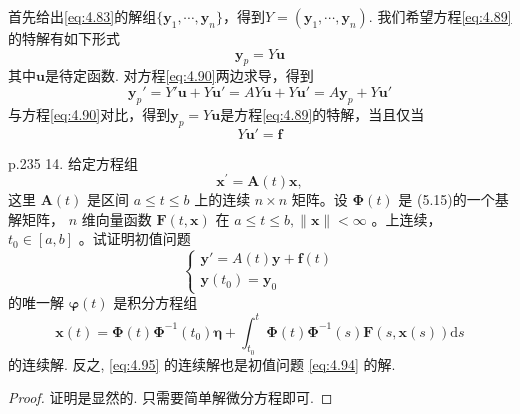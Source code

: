 首先给出\ref{eq:4.83}的解组$\{\mathbf{y}_1,\cdots,\mathbf{y}_n\}$，得到$Y=(\mathbf{y}_1,\cdots,\mathbf{y}_n)$. 我们希望方程\ref{eq:4.89}的特解有如下形式
\begin{equation}\label{eq:4.90}
    \mathbf{y}_p=Y\mathbf{u}
\end{equation}
其中$\mathbf{u}$是待定函数. 对方程\ref{eq:4.90}两边求导，得到
\begin{equation}\label{eq:4.91}
    \mathbf{y}_p'=Y'\mathbf{u}+Y\mathbf{u}'=AY\mathbf{u}+Y\mathbf{u}'=A\mathbf{y}_p+Y\mathbf{u}'
\end{equation}
与方程\ref{eq:4.90}对比，得到$\mathbf{y}_p=Y\mathbf{u}$是方程\ref{eq:4.89}的特解，当且仅当
\begin{equation}\label{eq:4.92}
    Y\mathbf{u}'=\mathbf{f}
\end{equation}
\begin{exercise}\label{ex:4.14}
    \cite{王高雄} p.235 14. 给定方程组
    $$
        \boldsymbol{x}^{\prime}=\boldsymbol{A}(t) \boldsymbol{x},
    $$
    这里 $\boldsymbol{A}(t)$ 是区间 $a \leqslant t \leqslant b$ 上的连续 $n \times n$ 矩阵。设 $\boldsymbol{\Phi}(t)$ 是 (5.15)的一个基解矩阵， $n$ 维向量函数 $\boldsymbol{F}(t, \boldsymbol{x})$ 在 $a \leqslant t \leqslant b,\|\boldsymbol{x}\|<\infty$ 。上连续， $t_0 \in[a, b]$ 。试证明初值问题
    \begin{equation}\label{eq:4.94}
        \begin{cases}
            \mathbf{y}'=A(t)\mathbf{y}+\mathbf{f}(t) \\
            \mathbf{y}(t_0)=\mathbf{y}_0
        \end{cases}
    \end{equation}
    的唯一解 $\boldsymbol{\varphi}(t)$ 是积分方程组
    \begin{equation}\label{eq:4.95}
        \boldsymbol{x}(t)=\boldsymbol{\Phi}(t) \boldsymbol{\Phi}^{-1}\left(t_0\right) \boldsymbol{\eta}+\int_{t_0}^t \boldsymbol{\Phi}(t) \boldsymbol{\Phi}^{-1}(s) \boldsymbol{F}(s, \boldsymbol{x}(s)) \mathrm{d} s
    \end{equation}
    的连续解. 反之, \ref{eq:4.95} 的连续解也是初值问题 \ref{eq:4.94} 的解.
\end{exercise}
\begin{proof}
    证明是显然的. 只需要简单解微分方程即可.
\end{proof}

